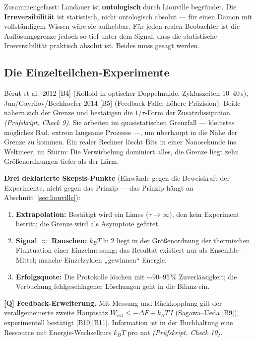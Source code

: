 Zusammengefasst: Landauer ist \textbf{ontologisch} durch Liouville begründet. Die
\textbf{Irreversibilität} ist statistisch, nicht ontologisch absolut --- für einen
Dämon mit vollständigem Wissen wäre sie aufhebbar. Für jeden realen Beobachter ist
die Auflösungsgrenze jedoch so tief unter dem Signal, dass die statistische
Irreversibilität praktisch absolut ist. Beides muss gesagt werden.

\subsection{Die Einzelteilchen-Experimente}

Bérut et al.\ 2012 [B4] (Kolloid in optischer Doppelmulde, Zykluszeiten
10--40\,s), Jun/Gavrilov/Bechhoefer 2014 [B5] (Feedback-Falle, höhere Präzision).
Beide nähern sich der Grenze und bestätigen die $1/\tau$-Form der
Zusatzdissipation \emph{(Prüfskript, Check 9)}. Sie arbeiten im quasistatischen Grenzfall ---
kleinstes mögliches Bad, extrem langsame Prozesse ---, um überhaupt in die Nähe
der Grenze zu kommen. Ein realer Rechner löscht Bits in einer Nanosekunde ins
Weltmeer, im Sturm: Die Verwirbelung dominiert alles, die Grenze liegt zehn
Größenordnungen tiefer als der Lärm.

\textbf{Drei deklarierte Skepsis-Punkte} (Einwände gegen die Beweiskraft der
Experimente, nicht gegen das Prinzip --- das Prinzip hängt an
Abschnitt~\ref{sec:liouville}):

\begin{enumerate}[leftmargin=1.6em,itemsep=0.25em]
  \item \textbf{Extrapolation:} Bestätigt wird ein Limes ($\tau\to\infty$), den
        kein Experiment betritt; die Grenze wird als Asymptote gefittet.
  \item \textbf{Signal $\approx$ Rauschen:} $k_B T \ln 2$ liegt in der
        Größenordnung der thermischen Fluktuation einer Einzelmessung; das
        Resultat existiert nur als Ensemble-Mittel; manche Einzelzyklen
        „gewinnen“ Energie.
  \item \textbf{Erfolgsquote:} Die Protokolle löschen mit ${\sim}90$--95\,\%
        Zuverlässigkeit; die Verbuchung fehlgeschlagener Löschungen geht in die
        Bilanz ein.
\end{enumerate}

\textbf{[Q]} \textbf{Feedback-Erweiterung.} Mit Messung und Rückkopplung gilt der
verallgemeinerte zweite Hauptsatz $W_{\text{ext}} \le -\Delta F + k_B T\,I$
(Sagawa--Ueda [B9]), experimentell bestätigt [B10][B11]. Information ist in der
Buchhaltung eine Ressource mit Energie-Wechselkurs $k_B T$ pro nat
\emph{(Prüfskript, Check 10)}.

